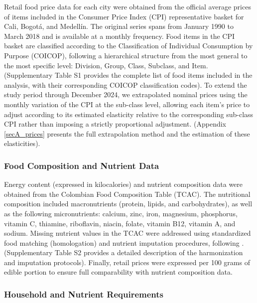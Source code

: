\documentclass[Afour, sageh,times]{sagej}
\begin{document}
Retail food price data for each city were obtained from the official average prices of items included in the Consumer Price Index (CPI) representative basket for Cali, Bogotá, and Medellín. The original series spans from January 1990 to March 2018 and is available at a monthly frequency. Food items in the CPI basket are classified according to the Classification of Individual Consumption by Purpose (COICOP), following a hierarchical structure from the most general to the most specific level: Division, Group, Class, Subclass, and Item. (Supplementary Table S1 provides the complete list of food items included in the analysis, with their corresponding COICOP classification codes). To extend the study period through December 2024, we extrapolated nominal prices using the monthly variation of the CPI at the sub-class level, allowing each item's price to adjust according to its estimated elasticity relative to the corresponding sub-class CPI rather than imposing a strictly proportional adjustment. (Appendix \ref{secA_prices} presents the full extrapolation method and the estimation of these elasticities).

\smallskip

\subsubsection{Food Composition and Nutrient Data}

Energy content (expressed in kilocalories) and nutrient composition data were obtained from the Colombian Food Composition Table (TCAC). The nutritional composition included macronutrients (protein, lipids, and carbohydrates), as well as the following micronutrients: calcium, zinc, iron, magnesium, phosphorus, vitamin C, thiamine, riboflavin, niacin, folate, vitamin B12, vitamin A, and sodium. Missing nutrient values in the TCAC were addressed using standardized food matching (homologation) and nutrient imputation procedures, following \citep{FAOINFOODS2012,ispirova2020}. (Supplementary Table S2 provides a detailed description of the harmonization and imputation protocols). Finally, retail prices were expressed per 100 grams of edible portion to ensure full comparability with nutrient composition data.

\subsubsection{Household and Nutrient Requirements}
\end{document}
